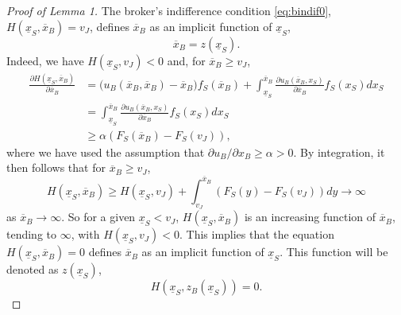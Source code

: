 \documentclass[11pt,twopage]{article}
\newcommand{\ol}{\overline}
\newcommand{\ul}{\underline}
\begin{document}
\begin{proof}[Proof of Lemma 1]
  The broker's indifference condition \eqref{eq:bindif0},
  $H(\underline x_S,\ol x_B) = v_J$, defines $\ol x_B$ as an implicit
  function of $\underline x_S$, \[ \ol x_B=z(\underline x_S).\]
  Indeed, we have $H(\ul x_S,v_J)<0$ and, for $\ol x_B \geq
  v_J$, \begin{align*} \frac{\partial H(\underline x_S,\ol
      x_B)}{\partial \ol x_B} &= \Big( u_B(\ol x_B,\ol x_B) - \ol x_B
    \Big)f_S(\ol x_B)+\int_{\ul x_S}^{\ol x_B} \frac{\partial u_B(\ol
      x_B,x_S)}{\partial \ol x_B} f_S(x_S) dx_S
    \\
    &= \int_{\ul x_S}^{\ol x_B} \frac{\partial u_B(\ol
      x_B,x_S)}{\partial \ol x_B} f_S(x_S) dx_S
    \\
    &\geq \alpha (F_S(\ol x_B) - F_S(v_J)),
  \end{align*}
  where we have used the assumption that $\partial u_B/\partial x_B
  \geq \alpha >0$. By integration, it then follows that for $\ol x_B
  \geq v_J$,
  \[
  H(\ul x_S, \ol x_B) \geq H( \ul x_S,v_J) + \int_{v_J}^{\ol x_B}
  (F_S(y) - F_S(v_J))dy \to \infty
  \]
  as $\ol x_B \to \infty$. So for a given $\ul x_S < v_J$, $H(\ul
  x_S,\ol x_B)$ is an increasing function of $\ol x_B$, tending to
  $\infty$, with $H(\ul x_S,v_J) < 0$. This implies that the equation
  $H(\ul x_S, \ol x_B) = 0$ defines $\ol x_B$ as an implicit function
  of $\ul x_S$. This function will be denoted as $z(\ul x_S)$,
  \[ H( \ul x_S, z_B(\ul x_S)) = 0 . \]


\end{proof}
\end{document}
